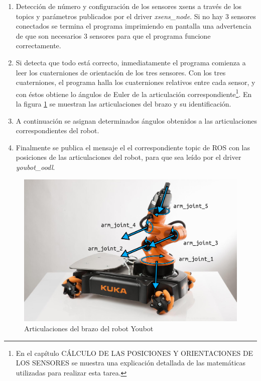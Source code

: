 \documentclass[12pt, a4paper]{report}
\begin{document}
\begin{enumerate}

\item Detección de número y configuración de los sensores xsens a través de los topics y parámetros publicados por el driver \textit{xsens\_node}. Si no hay 3 sensores conectados se termina el programa imprimiendo en pantalla una advertencia de que son necesarios 3 sensores para que el programa funcione correctamente.

\item Si detecta que todo está correcto, inmediatamente el programa comienza a leer los cuaterniones de orientación de los tres sensores. Con los tres cuaterniones, el programa halla los cuaterniones relativos entre cada sensor, y con éstos obtiene lo ángulos de Euler de la articulación correspondiente\footnote{En el capítulo CÁLCULO DE LAS POSICIONES Y ORIENTACIONES DE LOS SENSORES se muestra una explicación detallada de las matemáticas utilizadas para realizar esta tarea.}. En la figura \ref{fig: youbot_joints} se muestran las articulaciones del brazo y su identificación. 

\item A continuación se asignan determinados ángulos obtenidos a las articulaciones correspondientes del robot. 

\item Finalmente se publica el mensaje el el correspondiente topic de ROS con las posiciones de las articulaciones del robot, para que sea leído por el driver \textit{youbot\_oodl}.

\end{enumerate}

\begin{figure}[h]
	\centering
		\includegraphics[scale=0.3]{../img/youbot_joints.png} 
	\caption[Articulaciones del brazo robot Youbot]{Articulaciones del brazo del robot Youbot} 
	\label{fig: youbot_joints}
\end{figure}
\end{document}
